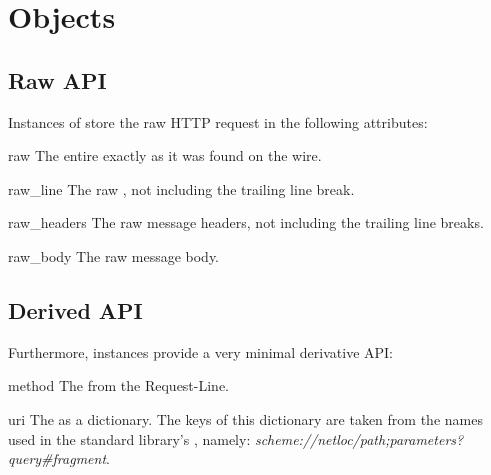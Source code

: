 \section{ Objects}

\subsection{Raw API}

Instances of  store the raw HTTP request in the following
attributes:

\begin{datadesc}{raw}
The entire  exactly as it was found on the wire.
\end{datadesc}

\begin{datadesc}{raw_line}
The raw
,
 not including the trailing line break.
\end{datadesc}

\begin{datadesc}{raw_headers}
The raw message headers, not including the trailing line breaks.
\end{datadesc}

\begin{datadesc}{raw_body}
The raw message body.
\end{datadesc}



\subsection{Derived API}

Furthermore,  instances provide a very minimal derivative API:

\begin{datadesc}{method}
The  from the Request-Line.
\end{datadesc}

\begin{datadesc}{uri}
The  as a dictionary. The keys of this dictionary are taken from the
names used in the standard library's
,
namely: \emph{scheme://netloc/path;parameters?query\#fragment}.
\end{datadesc}

